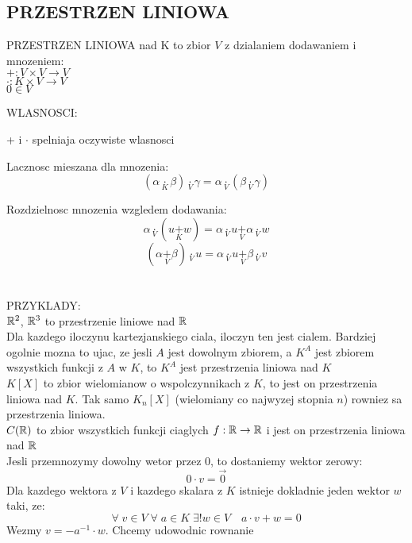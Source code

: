 \documentclass{article}
\begin{document}
\subsection*{PRZESTRZEN LINIOWA}
  \begin{center}
    \color{def}PRZESTRZEN LINIOWA nad K \color{txt}to zbior $V$ z dzialaniem dodawaniem i mnozeniem:\smallskip\\
    $+:V\times V\to V$\smallskip\\
    $\cdot:K\times V\to V$\smallskip\\
    $0\in V$
  \end{center}
  \color{def}WLASNOSCI:\color{txt}\smallskip\par
    + i $\cdot$ spelniaja oczywiste wlasnosci\smallskip\par
    Lacznosc mieszana dla mnozenia:
    $$(\alpha \underset{K}{\cdot}\beta)\underset{V}{\cdot}\gamma = \alpha\underset{V}{\cdot}(\beta\underset{V}{\cdot}\gamma)$$\par
    Rozdzielnosc mnozenia wzgledem dodawania:
    $$\alpha\underset{V}{\cdot}(u\underset{K}{+}w) = \alpha\underset{V}{\cdot}u\underset{V}{+}\alpha\underset{V}{\cdot}w$$
    $$(\alpha\underset{V}{+}\beta)\underset{V}{\cdot}u = \alpha\underset{V}{\cdot}u\underset{V}{+}\beta\underset{V}{\cdot}v$$ \\ \\
  \color{emp}PRZYKLADY:\color{txt}\smallskip\\
    $\mathbb{R}^2$, $\mathbb{R}^3$ to przestrzenie liniowe nad $\mathbb{R}$\medskip\\
    Dla kazdego iloczynu kartezjanskiego ciala, iloczyn ten jest cialem. Bardziej ogolnie mozna to ujac, ze jesli $A$ jest dowolnym zbiorem, a $K^A$ jest zbiorem wszystkich funkcji z $A$ w $K$, to $K^A$ jest przestrzenia liniowa nad $K$\medskip\\
    $K[X]$ to zbior wielomianow o wspolczynnikach z $K$, to jest on przestrzenia liniowa nad $K$. Tak samo $K_n[X]$ (wielomiany co najwyzej stopnia $n$) rowniez sa przestrzenia liniowa.\medskip\\
    $C(\mathbb{R})$ to zbior wszystkich funkcji ciaglych $f:\mathbb{R}\to\mathbb{R}$ i jest on przestrzenia liniowa nad $\mathbb{R}$\bigskip\\
  Jesli przemnozymy dowolny wetor przez 0, to dostaniemy \color{acc}wektor zerowy\color{txt}:
  $$0\cdot v=\overset{\to}{0}$$
  Dla kazdego wektora z $V$ i kazdego skalara z $K$ istnieje dokladnie jeden wektor $w$ taki, ze:
  $$\forall\;v\in V\;\forall\;a\in K\;\exists!w\in V\quad a\cdot v+w=0$$
  Wezmy $v=-a^{-1}\cdot w$. Chcemy udowodnic rownanie
\end{document}

